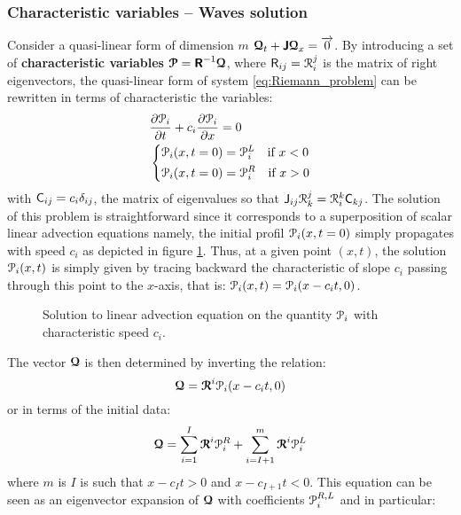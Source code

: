 \subsubsection*{Characteristic variables -- Waves solution}
Consider a quasi-linear form of dimension $m$ ${\boldsymbol{\mathcal{Q}}}_t + \boldsymbol{\mathsf{J}} {\boldsymbol{\mathcal{Q}}}_x={\overrightarrow{0}}$. 
By introducing a set of \textbf{characteristic variables} ${\boldsymbol{\mathcal{P}}}=\boldsymbol{\mathsf{R}}^{-1}{\boldsymbol{\mathcal{Q}}}$, where $\mathsf{R}_{ij}=\mathcal{R}^j_i$ is the matrix of right eigenvectors, the quasi-linear form of system \eqref{eq:Riemann_problem} can be rewritten in terms of characteristic the variables:
\begin{equation*}
  \begin{aligned}
    &\frac{\partial \mathcal{P}_i}{\partial t} + c_i\frac{\partial \mathcal{P}_i}{\partial x} = 0 \\
    &\left\lbrace 
      \begin{aligned}
        & \mathcal{P}_i(x,t=0) = \mathcal{P}_i^L \quad \text{if } x< 0\\
        & \mathcal{P}_i(x,t=0) = \mathcal{P}_i^R \quad \text{if } x> 0
      \end{aligned}
    \right.
  \end{aligned}
\end{equation*}
with $\mathsf{C}_{ij}=c_i\delta_{ij}$, the matrix of eigenvalues so that $\mathsf{J}_{ij} \mathcal{R}^j_k = \mathcal{R}^k_i\mathsf{C}_{kj}$. The solution of this problem is straightforward since it corresponds to a superposition of scalar linear advection equations namely, the initial profil $\mathcal{P}_i(x,t=0)$ simply propagates with speed $c_i$ as depicted in figure \ref{fig:advection}. Thus, at a given point $(x,t)$, the solution $\mathcal{P}_i(x,t)$ is simply given by tracing backward the characteristic of slope $c_i$ passing through this point to the $x$-axis, that is: $\mathcal{P}_i(x,t)=\mathcal{P}_i(x-c_it,0)$. 
\begin{figure}[h]
  \centering
  \subfloat{}
  \subfloat{}
  \caption{Solution to linear advection equation on the quantity $\mathcal{P}_i$ with characteristic speed $c_i$.}
  \label{fig:advection}
\end{figure}
The vector ${\boldsymbol{\mathcal{Q}}}$ is then determined by inverting the relation:
\begin{equation}
  {\boldsymbol{\mathcal{Q}}} = {\boldsymbol{\mathcal{R}}}^i \mathcal{P}_i(x-c_it,0)
\end{equation}
or in terms of the initial data:
\begin{equation}
  \label{eq:Q_expansion}
  {\boldsymbol{\mathcal{Q}}} = \sum_{i=1}^I {\boldsymbol{\mathcal{R}}}^i \mathcal{P}_i^R + \sum_{i=I+1}^m {\boldsymbol{\mathcal{R}}}^i \mathcal{P}_i^L
\end{equation}
where $m$ is $I$ is such that $x-c_I t >0$ and $x-c_{I+1} t <0$. This equation can be seen as an eigenvector expansion of ${\boldsymbol{\mathcal{Q}}}$ with coefficients $\mathcal{P}_i^{R,L}$ and in particular:
